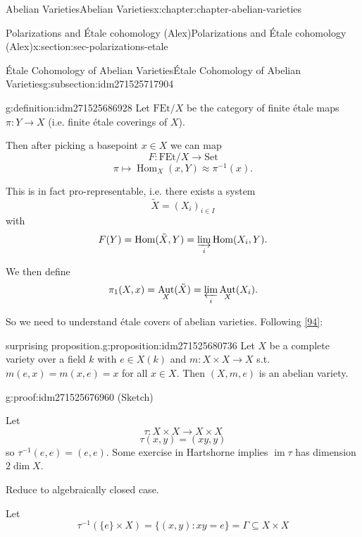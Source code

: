 \documentclass[oneside,10pt,]{book}
\numberwithin{equation}{section}
\DeclareMathOperator{\Hom}{Hom}
\DeclareMathOperator{\im}{im}
\DeclareMathOperator{\Aut}{Aut}
\begin{document}
\begin{chapterptx}{Abelian Varieties}{}{Abelian Varieties}{}{}{x:chapter:chapter-abelian-varieties}
\begin{sectionptx}{Polarizations and Étale cohomology (Alex)}{}{Polarizations and Étale cohomology (Alex)}{}{}{x:section:sec-polarizations-etale}
\begin{subsectionptx}{Étale Cohomology of Abelian Varieties}{}{Étale Cohomology of Abelian Varieties}{}{}{g:subsection:idm271525717904}
\begin{definition}{}{g:definition:idm271525686928}%
Let \(\mathrm{FEt}/X\) be the category of finite étale maps \(\pi\colon Y \to X\) (i.e. finite étale coverings of \(X\)).%
\par
Then after picking a basepoint \(x\in X\) we can map%
\begin{equation*}
F\colon \mathrm{FEt}/X\to \mathrm{Set}
\end{equation*}
%
\begin{equation*}
\pi\mapsto \Hom_X(x,Y) \approx\pi^{-1}(x)\text{.}
\end{equation*}
%
\par
This is in fact pro-representable, i.e. there exists a system%
\begin{equation*}
\tilde X = (X_i)_{i\in I}
\end{equation*}
with%
\begin{equation*}
F(Y) = \Hom(\tilde X ,Y) = \varinjlim_i \Hom(X_i, Y)\text{.}
\end{equation*}
%
\par
We then define%
\begin{equation*}
\pi_1(X,x) = \Aut_X(\tilde X) = \varprojlim_i \Aut_X(X_i)\text{.}
\end{equation*}
%
\end{definition}
So we need to understand étale covers of abelian varieties. Following \hyperlink{x:biblio:bib-vandergeer-moonen}{[94]}:%
\begin{proposition}{surprising proposition.}{}{g:proposition:idm271525680736}%
Let \(X\)  be a complete variety over a field \(k\) with \(e\in X(k)\) and \(m \colon X\times X\to X\) s.t. \(m(e,x) = m(x,e) = x\) for all \(x \in X\). Then \((X, m,e)\) is an abelian variety.%
\end{proposition}
\begin{proofptx}{}{g:proof:idm271525676960}
(Sketch)%
\par
Let%
\begin{equation*}
\tau\colon X\times X \to X\times X
\end{equation*}
%
\begin{equation*}
\tau(x,y) = (xy,y)
\end{equation*}
so \(\tau^{-1} (e,e) = (e,e)\). Some exercise in Hartshorne implies \(\im \tau\) has dimension \(2\dim X\).%
\par
Reduce to algebraically closed case.%
\par
Let%
\begin{equation*}
\tau^{-1}(\{e\} \times X) =  \{(x,y) : xy = e\} = \Gamma \subseteq X\times X

\end{equation*}
\end{proofptx}
\end{subsectionptx}
\end{sectionptx}
\end{chapterptx}
\end{document}
